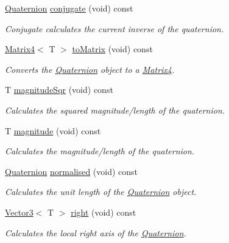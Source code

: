 \begin{DoxyCompactItemize}
\hyperlink{classsparky_1_1_quaternion}{Quaternion} \hyperlink{classsparky_1_1_quaternion_a9560d751d61d47377944f91f8a9089c5}{conjugate} (void) const 
\begin{DoxyCompactList}\small\item\em Conjugate calculates the current inverse of the quaternion. \end{DoxyCompactList}\item 
\hyperlink{classsparky_1_1_matrix4}{Matrix4}$<$ T $>$ \hyperlink{classsparky_1_1_quaternion_a2bb19a194d09c72add87d79f4216431c}{to\+Matrix} (void) const 
\begin{DoxyCompactList}\small\item\em Converts the \hyperlink{classsparky_1_1_quaternion}{Quaternion} object to a \hyperlink{classsparky_1_1_matrix4}{Matrix4}. \end{DoxyCompactList}\item 
T \hyperlink{classsparky_1_1_quaternion_afdeaacef8066f991ade5ddda36129077}{magnitude\+Sqr} (void) const 
\begin{DoxyCompactList}\small\item\em Calculates the squared magnitude/length of the quaternion. \end{DoxyCompactList}\item 
T \hyperlink{classsparky_1_1_quaternion_a002f6b0e3706c0bb1d4a8c73e562b0c7}{magnitude} (void) const 
\begin{DoxyCompactList}\small\item\em Calculates the magnitude/length of the quaternion. \end{DoxyCompactList}\item 
\hyperlink{classsparky_1_1_quaternion}{Quaternion} \hyperlink{classsparky_1_1_quaternion_a1f1cf033ed4e6fb9391c7e02ae0183e4}{normalised} (void) const 
\begin{DoxyCompactList}\small\item\em Calculates the unit length of the \hyperlink{classsparky_1_1_quaternion}{Quaternion} object. \end{DoxyCompactList}\item 
\hyperlink{classsparky_1_1_vector3}{Vector3}$<$ T $>$ \hyperlink{classsparky_1_1_quaternion_a0fe95a050029ea9cd63d688d75a2938b}{right} (void) const 
\begin{DoxyCompactList}\small\item\em Calculates the local right axis of the \hyperlink{classsparky_1_1_quaternion}{Quaternion}. \end{DoxyCompactList}\item 

\end{DoxyCompactItemize}
